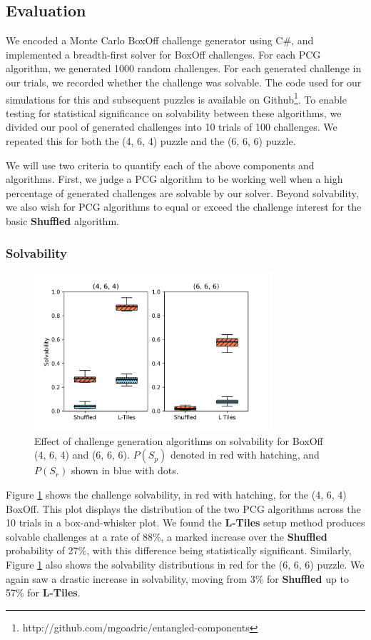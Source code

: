 \documentclass[journal]{IEEEtran}
\begin{document}
\subsection{Evaluation}
\noindent
We encoded a Monte Carlo BoxOff challenge generator using C\#, and implemented a breadth-first solver for BoxOff challenges. For each PCG algorithm, we generated 1000 random challenges. For each generated challenge in our trials, we recorded whether the challenge was solvable. The code used for our simulations for this and subsequent puzzles is available on Github\footnote{http://github.com/mgoadric/entangled-components}. 
To enable testing for statistical significance on solvability between these algorithms, we divided our pool of generated challenges into 10 trials of 100 challenges. We repeated this for both the (4, 6, 4) puzzle and the (6, 6, 6) puzzle.
 
We will use two criteria to quantify each of the above components and algorithms.
First, we judge a PCG algorithm to be working well when a high percentage of generated challenges are solvable by our solver. Beyond solvability, we also wish for PCG algorithms to equal or exceed the challenge interest for the basic \textbf{Shuffled} algorithm. 

\subsubsection{Solvability}

\begin{figure}[t]
\includegraphics[width=8.8cm]{figure7.png}
\caption{Effect of challenge generation algorithms on solvability for BoxOff (4, 6, 4) and (6, 6, 6). $P(S_p)$ denoted in red with hatching, and $P(S_r)$ shown in blue with dots.}
\label{fig:boxoffsolvediff}
\end{figure}

Figure \ref{fig:boxoffsolvediff} shows the challenge solvability, in red with hatching, for the (4, 6, 4) BoxOff. This plot displays the distribution of the two PCG algorithms across the 10 trials in a box-and-whisker plot.  
We found the {\bf L-Tiles} setup method produces solvable challenges at a rate of 88\%, a marked increase over the {\bf Shuffled} probability of 27\%, with this difference being statistically significant.
Similarly, Figure \ref{fig:boxoffsolvediff} also shows the solvability distributions in red for the (6, 6, 6) puzzle. We again saw a drastic increase in solvability, moving from 3\% for {\bf Shuffled} up to 57\% for {\bf L-Tiles}. 
\end{document}
